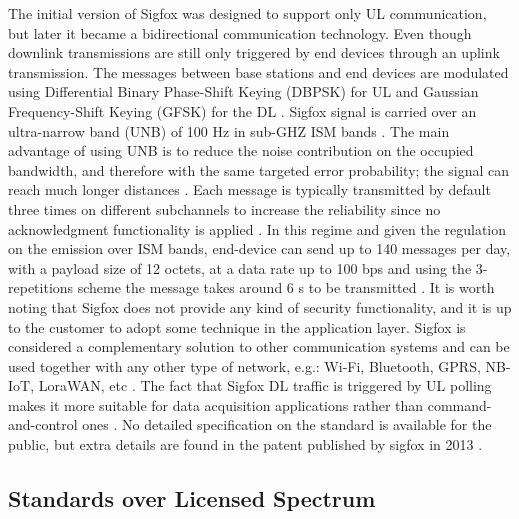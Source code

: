 \documentclass[]{IEEEtran}
\begin{document}
The initial version of Sigfox was designed to support only UL communication, but later it became a bidirectional communication technology. Even though downlink transmissions are still only triggered by end devices through an uplink transmission\cite{ding_iot_2020}. The messages between base stations and end devices are modulated using Differential Binary Phase-Shift Keying (DBPSK) for UL and Gaussian Frequency-Shift Keying (GFSK) for the DL \cite{kalfus2016ultra}. Sigfox signal is carried over an ultra-narrow band (UNB) of 100 Hz in sub-GHZ ISM bands \cite{mekki2019comparative}. The main advantage of using UNB is to reduce the noise contribution on the occupied bandwidth, and therefore with the same targeted error probability; the signal can reach much longer distances \cite{do2014interference}. Each message is typically transmitted by default three times on different subchannels to increase the reliability since no acknowledgment functionality is applied \cite{margelis2015low}. In this regime and given the regulation on the emission over ISM bands, end-device can send up to 140 messages per day, with a payload size of 12 octets, at a data rate up to 100 bps \cite{augustin2016study} and using the 3-repetitions scheme the message takes around 6 s to be transmitted \cite{kalfus2016ultra}. It is worth noting that Sigfox does not provide any kind of security functionality, and it is up to the customer to adopt some technique in the application layer\cite{margelis2015low}. Sigfox is considered a complementary solution to other communication systems and can be used together with any other type of network, e.g.: Wi-Fi, Bluetooth, GPRS, NB-IoT, LoraWAN, etc \cite{noauthor_what_nodate}. The fact that Sigfox DL traffic is triggered by UL polling makes it more suitable for data acquisition applications rather than command-and-control ones \cite{augustin2016study}. No detailed specification on the standard is available for the public, but extra details are found in the patent published by sigfox in 2013 \cite{vertes2017method}.



\subsection{Standards over Licensed Spectrum}
\label{sec:2-2}
\end{document}
